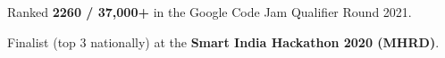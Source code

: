 \begin{zitemize}
    \item Ranked \textbf{2260 / 37,000+} in the Google Code Jam Qualifier Round 2021.
    \item Finalist (top 3 nationally) at the \textbf{Smart India Hackathon 2020 (MHRD)}.
\end{zitemize}
